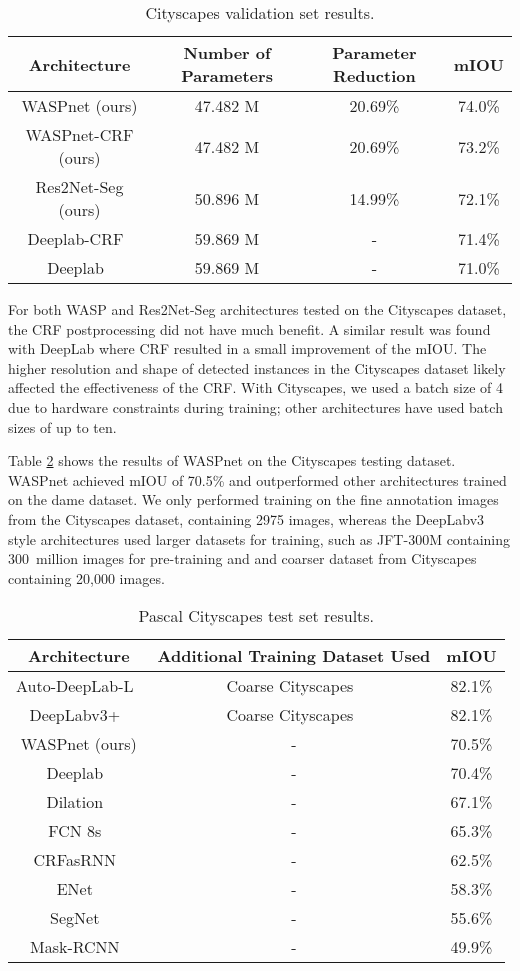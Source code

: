 \documentclass[sensors,article,accept,moreauthors,pdftex]{Definitions/mdpi}
\begin{document}
\begin{table}[H]
\caption{Cityscapes validation set results.}
\centering
\begin{tabular}{cccc}
\toprule
\textbf{Architecture}& \textbf{Number of Parameters} & \textbf{Parameter Reduction} & \textbf{mIOU}\\
\midrule
WASPnet (ours)&47.482 M&20.69\%&74.0\%\\
WASPnet-CRF (ours)&47.482 M&20.69\%&73.2\%\\
Res2Net-Seg (ours)&50.896 M&14.99\%&72.1\%\\
Deeplab-CRF~\cite{DeepLab}&59.869 M&-&71.4\%\\
Deeplab~\cite{DeepLab}&59.869 M&-&71.0\%\\
\bottomrule
\end{tabular}
\label{tab:TrainingCityscapes}
\end{table}

For both WASP and Res2Net-Seg architectures tested on the Cityscapes dataset, the CRF postprocessing did not have much benefit. A  similar result was found with DeepLab where CRF resulted in a small improvement of the mIOU.
The higher resolution and shape of detected instances in the Cityscapes dataset likely affected the effectiveness of the CRF.
With Cityscapes, we used a batch size of 4 due to hardware constraints during training; other architectures have used batch sizes of up to ten.


Table \ref{tab:TestingCityscapes} shows the results of WASPnet on the Cityscapes testing dataset. WASPnet achieved mIOU of 70.5\% and outperformed other architectures trained on the dame dataset.
We only performed training on the fine annotation images from the Cityscapes dataset, containing 2975 images, whereas the DeepLabv3 style architectures used larger datasets for training, such as JFT-300M containing 300~million images for pre-training and and coarser dataset from Cityscapes containing 20,000 images.

\begin{table}[H]
\caption{Pascal Cityscapes test set results.}
\centering
\begin{tabular}{ccc}
\toprule
\textbf{Architecture}&\textbf{Additional Training Dataset Used}&\textbf{mIOU}\\
\midrule
Auto-DeepLab-L~\cite{Auto-DeepLab}&Coarse Cityscapes~\cite{Cityscapes}&82.1\%\\
DeepLabv3+~\cite{DeepLabv3+}&Coarse Cityscapes~\cite{Cityscapes}&82.1\%\\
\midrule
WASPnet (ours)&-&70.5\%\\
Deeplab~\cite{DeepLab}&-&70.4\%\\
Dilation~\cite{DilatedConv}&-&67.1\%\\
FCN 8s~\cite{FCN}&-&65.3\%\\
CRFasRNN~\cite{CRFasRNN}&-&62.5\%\\
ENet~\cite{Enet}&-&58.3\%\\
SegNet~\cite{Segnet}&-&55.6\%\\
Mask-RCNN~\cite{MaskRCNN}&-&49.9\%\\
\bottomrule
\end{tabular}
\label{tab:TestingCityscapes}
\end{table}
\end{document}
